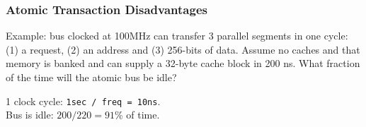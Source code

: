 \documentclass{beamer}
\newcommand{\emp}[1]{\textcolor{DikuRed}{ #1}}
\begin{document}
%
%
%

\begin{frame}[fragile,t]
\frametitle{Atomic Transaction Disadvantages}
Example: bus clocked at 100MHz can transfer 3 parallel segments in one cycle: 
(1) a request, (2) an address and (3) 256-bits of data. Assume no caches and
that memory is banked and can supply a 32-byte cache block in 200 ns. 
\alert{What fraction of the time will the atomic bus be idle?}
\bigskip\pause

1 clock cycle: {\tt 1sec / freq = 10ns}.\\ 
Bus is idle: $200/220 = 91$\% of time.

\end{frame}
\end{document}
